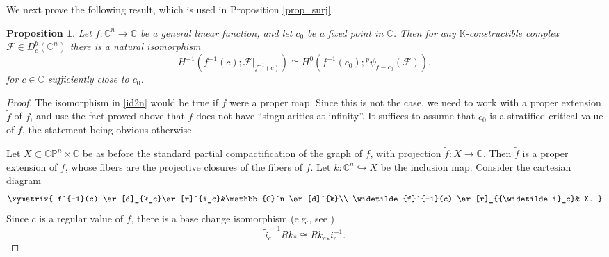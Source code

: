 \documentclass[12pt,leqno,twoside]{amsart}
\theoremstyle{plain}
\newtheorem{prop}[theorem]{Proposition}
\theoremstyle{definition}
\newcommand{\C}{\mathbb{C}}
\newcommand{\K}{\mathbb{K}}
\newcommand{\sA}{\mathcal{A}}
\newcommand{\sF}{\mathcal{F}}
\begin{document}
We next prove the following result, which is used in Proposition \ref{prop_surj}.

\begin{prop}\label{near} Let $f: \C^n\to \C$ be a general linear function, and let $c_0$ be a fixed point in $\C$. Then for any $\K$-constructible complex $\sF \in D^b_c(\C^n)$ there is a natural isomorphism
\begin{equation}\label{id2n}
H^{-1}(f^{-1}(c); \sF\vert_{f^{-1}(c)}) \cong H^{0}(f^{-1}(c_0); {^p}\psi_{f-c_0}(\sF)),
\end{equation}
for $c\in \C$ sufficiently close to $c_0$. 
\end{prop}


\begin{proof}
The isomorphism in \eqref{id2n} would be true if $f$ were a proper map. Since this is not the case, we need to work with a proper extension $\widetilde{f}$ of $f$, and use the fact proved above that $f$ does not have ``singularities at infinity''. It suffices  to assume that $c_0$ is a stratified critical value of $f$,
the statement being obvious otherwise.


Let $X\subset \C \mathbb{P}^n \times \C$ be as before the standard partial compactification of the graph of $f$, with projection $\widetilde{f}\colon X \to \C$.  Then $\widetilde{f}$ is a proper extension of $f$, whose fibers are the projective closures of the fibers of $f$. Let $k:\C^n \hookrightarrow X$ be the inclusion map. Consider the cartesian diagram
\[
\xymatrix{
f^{-1}(c) \ar[d]_{k_c}\ar[r]^{i_c}&\C^n \ar[d]^{k}\\
\widetilde{f}^{-1}(c) \ar[r]_{{\widetilde i}_c}& X.
}
\]
Since $c$ is a regular value of $f$, there is a base change isomorphism (e.g., see  \cite[Proposition 4.3.1, Remark 4.3.6]{Sch})
\begin{equation}\label{bc}
{{\widetilde i}_c}^{-1}Rk_*\cong R{k_c}_*i_c^{-1}.
\end{equation}

\end{proof}
\end{document}
